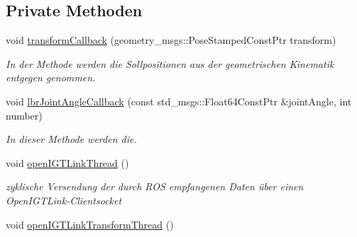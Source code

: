 \subsection*{Private Methoden}
\begin{DoxyCompactItemize}
\item 
void \hyperlink{classRosOpenIgtlBridge_a654f0a40a6e10644de54f0a47efcbb9d}{transform\-Callback} (geometry\-\_\-msgs\-::\-Pose\-Stamped\-Const\-Ptr transform)
\begin{DoxyCompactList}\small\item\em In der Methode werden die Sollpositionen aus der geometrischen Kinematik entgegen genommen. \end{DoxyCompactList}\item 
void \hyperlink{classRosOpenIgtlBridge_a8f02e3d18f60754c8d282db55eaed4c2}{lbr\-Joint\-Angle\-Callback} (const std\-\_\-msgs\-::\-Float64\-Const\-Ptr \&joint\-Angle, int number)
\begin{DoxyCompactList}\small\item\em In dieser Methode werden die. \end{DoxyCompactList}\item 
\hypertarget{classRosOpenIgtlBridge_adb7ae9d852083bcb79e2172ecc380cd6}{void \hyperlink{classRosOpenIgtlBridge_adb7ae9d852083bcb79e2172ecc380cd6}{open\-I\-G\-T\-Link\-Thread} ()}\label{classRosOpenIgtlBridge_adb7ae9d852083bcb79e2172ecc380cd6}

\begin{DoxyCompactList}\small\item\em zyklische Versendung der durch R\-O\-S empfangenen Daten über einen Open\-I\-G\-T\-Link-\/\-Clientsocket \end{DoxyCompactList}\item 
\hypertarget{classRosOpenIgtlBridge_a7477fb39f8246408e1e82e69fb17e866}{void \hyperlink{classRosOpenIgtlBridge_a7477fb39f8246408e1e82e69fb17e866}{open\-I\-G\-T\-Link\-Transform\-Thread} ()}\label{classRosOpenIgtlBridge_a7477fb39f8246408e1e82e69fb17e866}


\end{DoxyCompactItemize}
